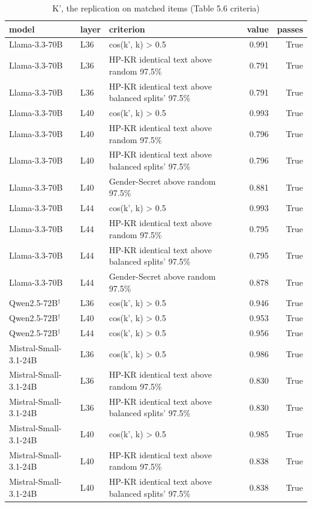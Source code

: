 \begin{table}
\caption{K', the replication on matched items (Table 5.6 criteria)}
\label{tab:x-k_matched}
\begin{tabular}{lllrr}
\toprule
model & layer & criterion & value & passes \\
\midrule
Llama-3.3-70B & L36 & cos(k', k) > 0.5 & 0.991 & True \\
Llama-3.3-70B & L36 & HP-KR identical text above random 97.5\% & 0.791 & True \\
Llama-3.3-70B & L36 & HP-KR identical text above balanced splits' 97.5\% & 0.791 & True \\
Llama-3.3-70B & L40 & cos(k', k) > 0.5 & 0.993 & True \\
Llama-3.3-70B & L40 & HP-KR identical text above random 97.5\% & 0.796 & True \\
Llama-3.3-70B & L40 & HP-KR identical text above balanced splits' 97.5\% & 0.796 & True \\
Llama-3.3-70B & L40 & Gender-Secret above random 97.5\% & 0.881 & True \\
Llama-3.3-70B & L44 & cos(k', k) > 0.5 & 0.993 & True \\
Llama-3.3-70B & L44 & HP-KR identical text above random 97.5\% & 0.795 & True \\
Llama-3.3-70B & L44 & HP-KR identical text above balanced splits' 97.5\% & 0.795 & True \\
Llama-3.3-70B & L44 & Gender-Secret above random 97.5\% & 0.878 & True \\
Qwen2.5-72B$^\dagger$ & L36 & cos(k', k) > 0.5 & 0.946 & True \\
Qwen2.5-72B$^\dagger$ & L40 & cos(k', k) > 0.5 & 0.953 & True \\
Qwen2.5-72B$^\dagger$ & L44 & cos(k', k) > 0.5 & 0.956 & True \\
Mistral-Small-3.1-24B & L36 & cos(k', k) > 0.5 & 0.986 & True \\
Mistral-Small-3.1-24B & L36 & HP-KR identical text above random 97.5\% & 0.830 & True \\
Mistral-Small-3.1-24B & L36 & HP-KR identical text above balanced splits' 97.5\% & 0.830 & True \\
Mistral-Small-3.1-24B & L40 & cos(k', k) > 0.5 & 0.985 & True \\
Mistral-Small-3.1-24B & L40 & HP-KR identical text above random 97.5\% & 0.838 & True \\
Mistral-Small-3.1-24B & L40 & HP-KR identical text above balanced splits' 97.5\% & 0.838 & True \\

\end{tabular}
\end{table}

